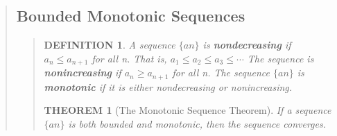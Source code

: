 \documentclass{report}
\newtheorem{theorem}{THEOREM}
\newtheorem*{definition}{DEFINITION}
\begin{document}
\begin{quote}
\begin{quote}
	\end{quote}

	\subsection{Bounded Monotonic Sequences}
	\begin{quote}

		\begin{definition}
			A sequence $\{an\}$ is \textbf{nondecreasing} if $a_n \leq a_{n+1}$ for all n. That is, $a_1 \leq a_2 \leq a_3 \leq \cdots$ The sequence is \textbf{nonincreasing} if $a_n \geq a_{n+1}$ for all n. The sequence $\{an\}$ is \textbf{monotonic} if it is either nondecreasing or nonincreasing.
		\end{definition}

		\begin{theorem}[The Monotonic Sequence Theorem]
			\mbox{}\par
			If a sequence $\{an\}$ is both bounded and monotonic, then the sequence converges. 
		\end{theorem}
			
	\end{quote}

\end{quote}

\end{document}
